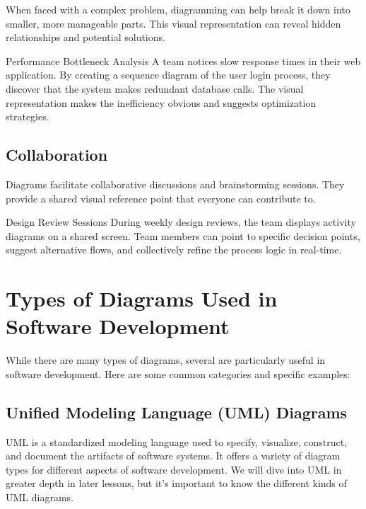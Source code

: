 When faced with a complex problem, diagramming can help break it down into smaller, more manageable parts. This visual representation can reveal hidden relationships and potential solutions.

\begin{examplecard}{Performance Bottleneck Analysis}
  A team notices slow response times in their web application. By creating a sequence diagram of the user login process, they discover that the system makes redundant database calls. The visual representation makes the inefficiency obvious and suggests optimization strategies.
\end{examplecard}

\subsection{Collaboration}

Diagrams facilitate collaborative discussions and brainstorming sessions. They provide a shared visual reference point that everyone can contribute to.

\begin{examplecard}{Design Review Sessions}
  During weekly design reviews, the team displays activity diagrams on a shared screen. Team members can point to specific decision points, suggest alternative flows, and collectively refine the process logic in real-time.
\end{examplecard}

\section{Types of Diagrams Used in Software Development}

While there are many types of diagrams, several are particularly useful in software development. Here are some common categories and specific examples:


\subsection{Unified Modeling Language (UML) Diagrams}

UML is a standardized modeling language used to specify, visualize, construct, and document the artifacts of software systems. It offers a variety of diagram types for different aspects of software development. We will dive into UML in greater depth in later lessons, but it's important to know the different kinds of UML diagrams.

